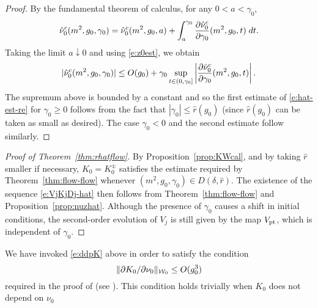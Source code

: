 \begin{proof}
By the fundamental theorem of calculus, for any $0 < a < \gamma_0$,
\begin{equation}
\hat\nu_0^c(m^2, g_0, \gamma_0)
  =
\hat\nu_0^c(m^2, g_0, a)
  +
\int_a^{\gamma_0} \frac{\partial \hat\nu_0^c}{\partial \gamma_0} (m^2, g_0, t) \; dt.
\end{equation}
Taking the limit $a\downarrow 0$ and using \eqref{e:z0est}, we obtain
\begin{equation}
|\hat\nu_0^c(m^2, g_0, \gamma_0)|
  \leq
O(g_0)
  +
\gamma_0
\sup_{t \in (0, \gamma_0]}
\left|\frac{\partial \hat\nu_0^c}{\partial \gamma_0}(m^2, g_0, t)\right|.
\end{equation}
The supremum above is bounded by a constant and so
the first estimate of \eqref{e:hat-est-re} for $\gamma_0 \geq 0$
follows from the fact that $|\gamma_0| \leq \hat r(g_0)$
(since $\hat r(g_0)$ can be taken as small as desired).
The case $\gamma_0 < 0$ and the second estimate follow similarly.
\end{proof}

\begin{proof}[Proof of Theorem~\ref{thm:rhatflow}]
By Proposition~\ref{prop:KWcal},
and by taking $\hat r$ smaller if necessary,
$K_0 = K^\pm_0$ satisfies the estimate required by Theorem~\ref{thm:flow-flow}
whenever $(m^2, g_0, \gamma_0) \in D(\delta, \hat r)$. The
existence of the sequence \eqref{e:VjKjDj-hat} then follows from
Theorem~\ref{thm:flow-flow} and Proposition~\ref{prop:nuzhat}.
Although the presence of $\gamma_0$ causes a shift in initial
conditions, the second-order evolution of $V_j$ is still given by the map
$V_{\rm pt}$,
which is independent of $\gamma_0$.
\end{proof}

\begin{rk}
We have invoked \eqref{e:ddpK} above in order to satisfy the condition
\begin{equation}
\|\partial K_0/\partial\nu_0\|_{\mathcal{W}_0} \le O(g_0^3)
\end{equation}
required in the proof of \cite[Lemma~\ref{log-lem:gzmuprime}]{BBS-saw4-log}
(see \cite[\eqref{log-e:induct1}]{BBS-saw4-log}). This condition holds trivially
when $K_0$ does not depend on $\nu_0$
\end{rk}
